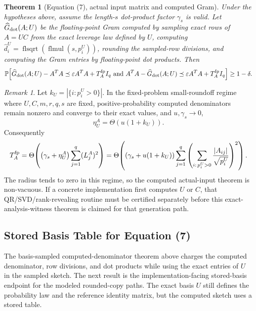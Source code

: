 \documentclass[11pt]{article}
\newcommand{\Prob}{\mathbb{P}}
\newcommand{\Ghat}{\widehat G}
\newcommand{\I}{I}
\newcommand{\eps}{\varepsilon}
\newtheorem{theorem}{Theorem}
\theoremstyle{remark}
\newtheorem*{remark}{Remark}
\begin{document}
\begin{theorem}[Equation (7), actual input matrix and computed Gram]
Under the hypotheses above, assume the length-\(s\) dot-product factor
\(\gamma_s\) is valid.  Let \(\Ghat_{\rm dot}(A;U)\) be the floating-point
Gram computed by sampling exact rows of \(A=UC\) from the exact leverage law
defined by \(U\), computing
\(\widehat d_i^U=\operatorname{flsqrt}(\operatorname{flmul}(s,p_i^U))\),
rounding the sampled-row divisions, and computing the Gram entries by
floating-point dot products.  Then
\[
  \Prob\!\left[
    \Ghat_{\rm dot}(A;U)-A^TA
      \preceq
      \eps A^TA+T_A^{\rm fp}\I_q
    \ \hbox{and}\
    A^TA-\Ghat_{\rm dot}(A;U)
      \preceq
      \eps A^TA+T_A^{\rm fp}\I_q
  \right]\ge 1-\delta .
\]
\end{theorem}

\begin{remark}
Let \(k_U=|\{i:p_i^U>0\}|\).  In the fixed-problem small-roundoff regime where
\(U,C,m,r,q,s\) are fixed, positive-probability computed denominators remain
nonzero and converge to their exact values, and \(u,\gamma_s\to0\),
\[
  \eta_U^A=\Theta(u(1+k_U)).
\]
Consequently
\[
  T_A^{\rm fp}
  =
  \Theta\!\left(
    \bigl(\gamma_s+\eta_U^A\bigr)
    \sum_{j=1}^q (L_j^A)^2
  \right)
  =
  \Theta\!\left(
    \left(\gamma_s+u(1+k_U)\right)
    \sum_{j=1}^q
    \left(
      \sum_{i:\,p_i^U>0}
      \frac{|A_{ij}|}{\sqrt{p_i^U}}
    \right)^2
  \right).
\]
The radius tends to zero in this regime, so the computed actual-input theorem
is non-vacuous.  If a concrete implementation first computes \(U\) or \(C\),
that QR/SVD/rank-revealing routine must be certified separately before this
exact-analysis-witness theorem is claimed for that generation path.
\end{remark}

\subsection*{Stored Basis Table for Equation (7)}

The basis-sampled computed-denominator theorem above charges the computed
denominator, row divisions, and dot products while using the exact entries of
\(U\) in the sampled sketch.  The next result is the implementation-facing
stored-basis endpoint for the modeled rounded-copy paths.  The exact basis
\(U\) still defines the probability law and the reference identity matrix, but
the computed sketch uses a stored table.
\end{document}

